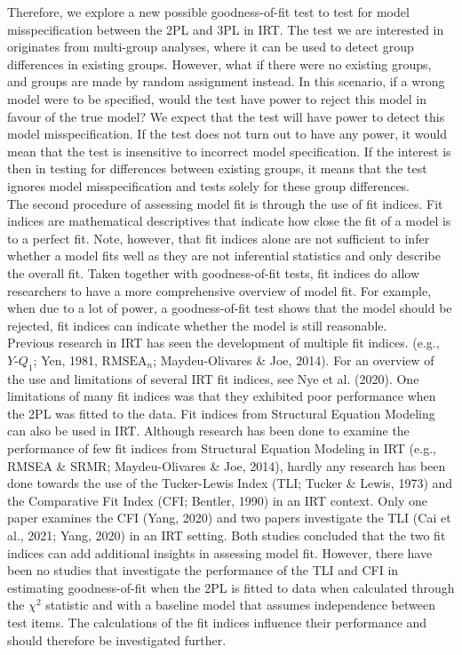 \documentclass[Royal,sageapa,times,doublespace]{sagej}
\begin{document}
\indent Therefore, we explore a new possible goodness-of-fit test to test for model misspecification between the 2PL and 3PL in IRT. The test we are interested in originates from multi-group analyses, where it can be used to detect group differences in existing groups. However, what if there were no existing groups, and groups are made by random assignment instead. In this scenario, if a wrong model were to be specified, would the test have power to reject this model in favour of the true model? We expect that the test will have power to detect this model misspecification. If the test does not turn out to have any power, it would mean that the test is insensitive to incorrect model specification. If the interest is then in testing for differences between existing groups, it means that the test ignores model misspecification and tests solely for these group differences. \\
\indent The second procedure of assessing model fit is through the use of fit indices. Fit indices are mathematical descriptives that indicate how close the fit of a model is to a perfect fit. Note, however, that fit indices alone are not sufficient to infer whether a model fits well as they are not inferential statistics and only describe the overall fit. Taken together with goodness-of-fit tests, fit indices do allow researchers to have a more comprehensive overview of model fit. For example, when due to a lot of power, a goodness-of-fit test shows that the model should be rejected, fit indices can indicate whether the model is still reasonable. \\ 
\indent Previous research in IRT has seen the development of multiple fit indices. (e.g., $Y\text{-}Q_1$; Yen, 1981, $\text{RMSEA}_n$; Maydeu-Olivares \& Joe, 2014). For an overview of the use and limitations of several IRT fit indices, see Nye et al. (2020). One limitations of many fit indices was that they exhibited poor performance when the 2PL was fitted to the data. Fit indices from Structural Equation Modeling can also be used in IRT. Although research has been done to examine the performance of few fit indices from Structural Equation Modeling in IRT (e.g., RMSEA \& SRMR; Maydeu-Olivares \& Joe, 2014), hardly any research has been done towards the use of the Tucker-Lewis Index (TLI; Tucker \& Lewis, 1973) and the Comparative Fit Index (CFI; Bentler, 1990) in an IRT context. Only one paper examines the CFI (Yang, 2020) and two papers investigate the TLI (Cai et al., 2021; Yang, 2020) in an IRT setting. Both studies concluded that the two fit indices can add additional insights in assessing model fit. However, there have been no studies that investigate the performance of the TLI and CFI in estimating goodness-of-fit when the 2PL is fitted to data when calculated through the $\chi^2$ statistic and with a baseline model that assumes independence between test items. The calculations of the fit indices influence their performance and should therefore be investigated further. \\
\end{document}

